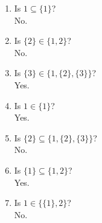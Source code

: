 \documentclass{article}
\begin{document}
\begin{enumerate}
\begin{enumerate}
        \hrulefill

        \item Is $1 \subseteq \{1\}$?\\
        \vspace{1em}
        No.
        \vspace{1em}
        
        \hrulefill

        \item Is $\{2\} \in \{1, 2\}$?\\
        \vspace{1em}
        No.
        \vspace{1em}
        
        \hrulefill

        \item Is $\{3\} \in \{1, \{2\}, \{3\}\}$?\\
        \vspace{1em}
        Yes.
        \vspace{1em}
        
        \hrulefill

        \item Is $1 \in \{1\}$?\\
        \vspace{1em}
        Yes.
        \vspace{1em}
        
        \hrulefill

        \item Is $\{2\} \subseteq \{1, \{2\}, \{3\}\}$?\\
        \vspace{1em}
        No.
        \vspace{1em}
        
        \hrulefill

        \item Is $\{1\} \subseteq \{1, 2\}$?\\
        \vspace{1em}
        Yes.
        \vspace{1em}
        
        \hrulefill

        \item Is $1 \in \{\{1\}, 2\}$?\\
        \vspace{1em}
        No.
        \vspace{1em}
        
        \hrulefill


\end{enumerate}
\end{enumerate}
\end{document}
